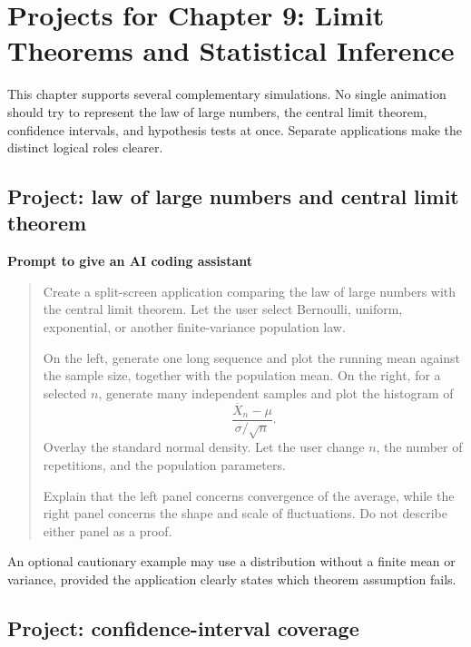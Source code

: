 \section{Projects for Chapter 9: Limit Theorems and Statistical Inference}

This chapter supports several complementary simulations. No single animation should try to represent the law of large numbers, the central limit theorem, confidence intervals, and hypothesis tests at once. Separate applications make the distinct logical roles clearer.

\subsection*{Project: law of large numbers and central limit theorem}

\begin{examplebox}
\textbf{Prompt to give an AI coding assistant}

\begin{quote}\small
Create a split-screen application comparing the law of large numbers with the central limit theorem. Let the user select Bernoulli, uniform, exponential, or another finite-variance population law.

On the left, generate one long sequence and plot the running mean against the sample size, together with the population mean. On the right, for a selected \(n\), generate many independent samples and plot the histogram of
\[
\frac{\overline X_n-\mu}{\sigma/\sqrt n}.
\]
Overlay the standard normal density. Let the user change \(n\), the number of repetitions, and the population parameters.

Explain that the left panel concerns convergence of the average, while the right panel concerns the shape and scale of fluctuations. Do not describe either panel as a proof.
\end{quote}
\end{examplebox}

An optional cautionary example may use a distribution without a finite mean or variance, provided the application clearly states which theorem assumption fails.

\subsection*{Project: confidence-interval coverage}

